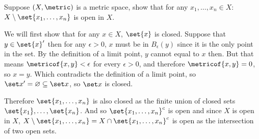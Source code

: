 \documentclass[10pt]{article}
\makeatletter
\def\@blist[#1]{%
    \bgroup\bgroup\par\vskip-\medskipamount%
    \gdef\item{%
        \par\egroup\bgroup\medskip\setbox0=\hbox{#1\quad}%
        \advance\leftskip by \wd0\leavevmode\kern-\wd0\box0%
    }%
}
\def\blist{\@ifnextchar[ \@blist {\@blist[$\bullet$]}}
\def\elist{\par\egroup\egroup\medskip}
\makeatother
\begin{document}


\bigskip

\begin{exercise*}

    Suppose $(X,\metric)$ is a metric space, show that for any $x_1,\dots,x_n\in X$: $X\setminus\set{x_1,\dots,x_n}$ is open in $X$.

\end{exercise*}

\begin{blankpp}

    We will first show that for any $x\in X$, $\set{x}$ is closed.
    Suppose that $y\in\set{x}'$ then for any $\epsilon>0$, $x$ must be in $B_\epsilon(y)$ since it is the only point in the set.
    By the definition of a limit point, $y$ cannot equal to $x$ then.
    But that means $\metricof{x,y}<\epsilon$ for every $\epsilon>0$, and therefore $\metricof{x,y}=0$, so $x=y$.
    Which contradicts the definition of a limit point, so $\set x'=\varnothing\subseteq\set x$, so $\set x$ is closed.

    Therefore $\set{x_1,\dots,x_n}$ is also closed as the finite union of closed sets $\set{x_1},\dots,\set{x_n}$.
    And so $\set{x_1,\dots,x_n}^c$ is open and since $X$ is open in $X$, $X\setminus\set{x_1,\dots,x_n}=X\cap\set{x_1,\dots,x_n}^c$
    is open as the intersection of two open sets.

\end{blankpp}

\end{document}
